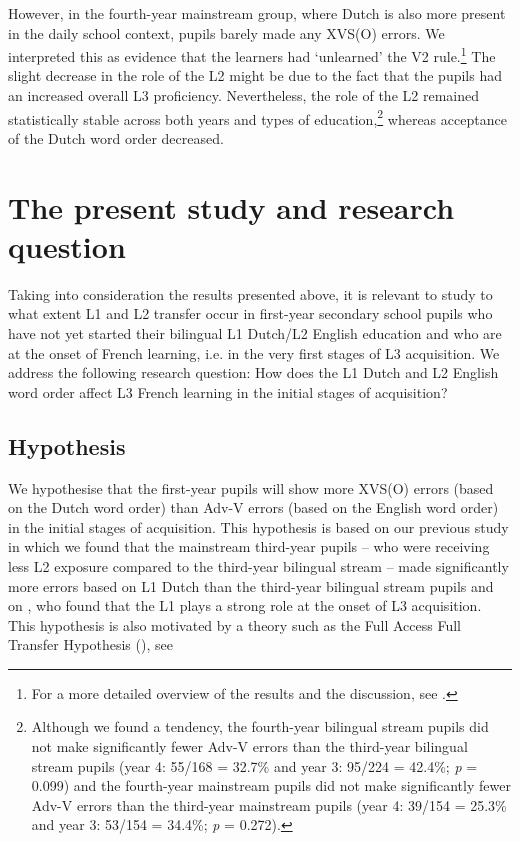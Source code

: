 \documentclass[output=paper,modfonts,nonflat, newtxmath]{langsci/langscibook}
\begin{document}
  However, in the fourth-year mainstream group, where Dutch is also more present in the daily school context, pupils barely made any XVS(O) errors. We interpreted this as evidence that the learners had ‘unlearned’ the V2 rule.\footnote{ \textrm{For a more detailed overview of the results and the discussion, see \citet{StadtEtAl2016, StadtEtAl2018Exposure}.}} The slight decrease in the role of the L2 might be due to the fact that the pupils had an increased overall L3 proficiency. Nevertheless, the role of the L2 remained statistically stable across both years and types of education,\footnote{ \textrm{Although we found a tendency, the} \textrm{fourth-year} \textrm{bilingual stream pupils did not make significantly fewer Adv-V errors than the third-year bilingual stream pupils (year 4: 55/168 = 32.7\% and year 3: 95/224 = 42.4\%;} \textrm{\textit{p} }\textrm{= 0.099) and the fourth-year mainstream pupils did not make significantly fewer Adv-V errors than the third-year mainstream pupils (year 4: 39/154 = 25.3\% and year 3: 53/154 = 34.4\%;} \textrm{\textit{p} }\textrm{= 0.272).}} whereas acceptance of the Dutch word order decreased.

\section{{The} {present} {study} {and} {research} {question}}%
\label{sec:stadt:3}

Taking into consideration the results presented above, it is relevant to study to what extent L1 and L2 transfer occur in first-year secondary school pupils who have not yet started their bilingual L1 Dutch/L2 English education and who are at the onset of French learning, i.e. in the very first stages of L3 acquisition. We address the following research question: How does the L1 Dutch and L2 English word order affect L3 French learning in the initial stages of acquisition?

\subsection{{Hypothesis} }%
\label{sec:stadt:3.1}

We hypothesise that the first-year pupils will show more XVS(O) errors (based on the Dutch word order) than Adv-V errors (based on the English word order) in the initial stages of acquisition. This hypothesis is based on our previous study \citep{StadtEtAl2016} in which we found that the mainstream third-year pupils – who were receiving less L2 exposure compared to the third-year bilingual stream – made significantly more errors based on L1 Dutch than the third-year bilingual stream pupils and on \citep{Hermas2010, Hermas2014Morphosyntax, Hermas2014Relatives}, who found that the L1 plays a strong role at the onset of L3 acquisition. This hypothesis is also motivated by a theory such as the Full Access Full Transfer Hypothesis (\citealt{SchwartzSprouse1996}), see 
\end{document}
